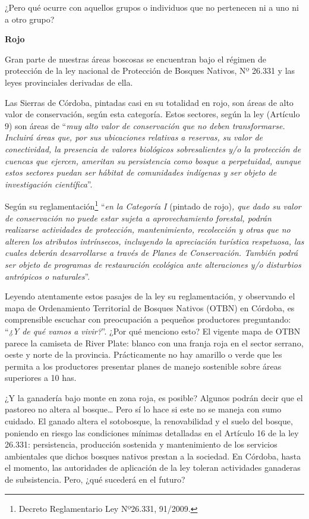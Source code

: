 \begin{fullwidth}
¿Pero qué ocurre con aquellos grupos o individuos que no pertenecen ni a
uno ni a otro grupo?

\textbf{Rojo}

Gran parte de nuestras áreas boscosas se encuentran bajo el régimen de
protección de la ley nacional de Protección de Bosques Nativos, Nº
26.331 y las leyes provinciales derivadas de ella.

Las Sierras de Córdoba, pintadas casi en su totalidad en rojo, son áreas
de alto valor de conservación, según esta categoría. Estos sectores,
según la ley (Artículo 9) son áreas de ``\emph{muy alto valor de
conservación que no deben transformarse. Incluirá áreas que, por sus
ubicaciones relativas a reservas, su valor de conectividad, la presencia
de valores biológicos sobresalientes y/o la protección de cuencas que
ejercen, ameritan su persistencia como bosque a perpetuidad, aunque
estos sectores puedan ser hábitat de comunidades indígenas y ser objeto
de investigación científica}''.

Según su reglamentación\footnote{Decreto Reglamentario Ley Nº26.331,
  91/2009.} ``\emph{en la Categoría I} (pintado de rojo)\emph{, que dado
su valor de conservación no puede estar sujeta a aprovechamiento
forestal, podrán realizarse actividades de protección, mantenimiento,
recolección y otras que no alteren los atributos intrínsecos, incluyendo
la apreciación turística respetuosa, las cuales deberán desarrollarse a
través de Planes de Conservación. También podrá ser objeto de programas
de restauración ecológica ante alteraciones y/o disturbios antrópicos o
naturales}''.

Leyendo atentamente estos pasajes de la ley su reglamentación, y
observando el mapa de Ordenamiento Territorial de Bosques Nativos (OTBN)
en Córdoba, es comprensible escuchar con preocupación a pequeños
productores preguntando: ``\emph{¿Y de qué vamos a vivir?}''. ¿Por qué
menciono esto? El vigente mapa de OTBN parece la camiseta de River
Plate: blanco con una franja roja en el sector serrano, oeste y norte de
la provincia. Prácticamente no hay amarillo o verde que les permita a
los productores presentar planes de manejo sostenible sobre áreas
superiores a 10 has.

¿Y la ganadería bajo monte en zona roja, es posible? Algunos podrán
decir que el pastoreo no altera al bosque\ldots{} Pero sí lo hace si
este no se maneja con sumo cuidado. El ganado altera el sotobosque, la
renovabilidad y el suelo del bosque, poniendo en riesgo las condiciones
mínimas detalladas en el Artículo 16 de la ley 26.331: persistencia,
producción sostenida y mantenimiento de los servicios ambientales que
dichos bosques nativos prestan a la sociedad. En Córdoba, hasta el
momento, las autoridades de aplicación de la ley toleran actividades
ganaderas de subsistencia. Pero, ¿qué sucederá en el futuro?


\end{fullwidth}
